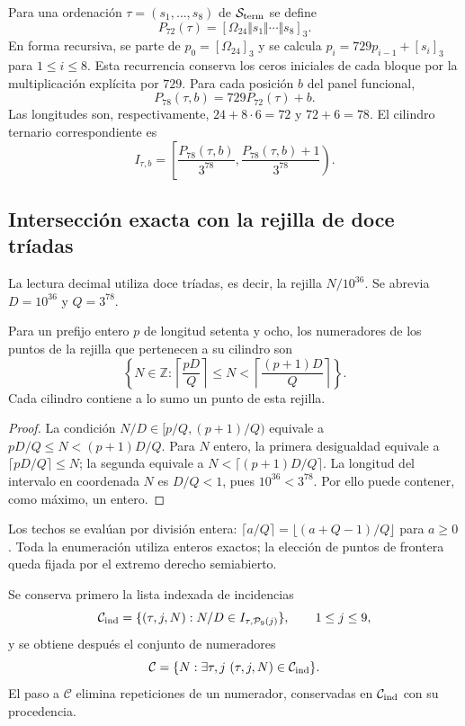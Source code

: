 Para una ordenación $\tau=(s_1,\ldots,s_8)$ de
$\mathcal S_{\rm term}$ se define
\[
 P_{72}(\tau)=[\Omega_{24}\Vert s_1\Vert\cdots\Vert s_8]_3.
\]
En forma recursiva, se parte de $p_0=[\Omega_{24}]_3$ y se calcula
$p_i=729p_{i-1}+[s_i]_3$ para $1\leq i\leq8$. Esta recurrencia
conserva los ceros iniciales de cada bloque por la multiplicación
explícita por $729$. Para cada posición $b$ del panel funcional,
\[
 P_{78}(\tau,b)=729P_{72}(\tau)+b.
\]
Las longitudes son, respectivamente, $24+8\cdot6=72$ y $72+6=78$.
El cilindro ternario correspondiente es
\begin{equation}
 I_{\tau,b}=
 \left[\frac{P_{78}(\tau,b)}{3^{78}},
       \frac{P_{78}(\tau,b)+1}{3^{78}}\right).
 \label{eq:kdes-cilindro}
\end{equation}

\subsection{Intersección exacta con la rejilla de doce tríadas}

La lectura decimal utiliza doce tríadas, es decir, la rejilla
$N/10^{36}$. Se abrevia $D=10^{36}$ y $Q=3^{78}$.

\begin{lemma}
Para un prefijo entero $p$ de longitud setenta y ocho, los numeradores
de los puntos de la rejilla que pertenecen a su cilindro son
\begin{equation}
 \left\{N\in\mathbb Z:
 \left\lceil\frac{pD}{Q}\right\rceil
 \leq N<
 \left\lceil\frac{(p+1)D}{Q}\right\rceil\right\}.
 \label{eq:kdes-rejilla}
\end{equation}
Cada cilindro contiene a lo sumo un punto de esta rejilla.
\end{lemma}
\begin{proof}
La condición $N/D\in[p/Q,(p+1)/Q)$ equivale a
$pD/Q\leq N<(p+1)D/Q$. Para $N$ entero, la primera desigualdad
equivale a $\lceil pD/Q\rceil\leq N$; la segunda equivale a
$N<\lceil(p+1)D/Q\rceil$. La longitud del intervalo en coordenada
$N$ es $D/Q<1$, pues $10^{36}<3^{78}$. Por ello puede contener,
como máximo, un entero.
\end{proof}

Los techos se evalúan por división entera:
$\lceil a/Q\rceil=\lfloor(a+Q-1)/Q\rfloor$ para $a\geq0$.
Toda la enumeración utiliza enteros exactos; la elección de puntos de
frontera queda fijada por el extremo derecho semiabierto.

Se conserva primero la lista indexada de incidencias
\[
 \mathcal C_{\rm ind}=
 \{(\tau,j,N):N/D\in I_{\tau,\mathcal P_9(j)}\},
 \qquad1\leq j\leq9,
\]
y se obtiene después el conjunto de numeradores
\[
 \mathcal C=\{N:\exists\tau,j\ (\tau,j,N)\in\mathcal C_{\rm ind}\}.
\]
El paso a $\mathcal C$ elimina repeticiones de un numerador, conservadas
en $\mathcal C_{\rm ind}$ con su procedencia.

